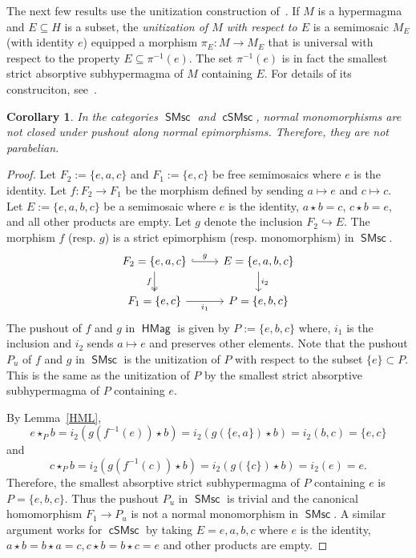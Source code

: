 \documentclass[reqno]{amsart}
\newcommand{\cat}[1]{\ensuremath{\mathsf{#1}}}
\DeclareMathOperator{\HMag}{\cat{HMag}}
\DeclareMathOperator{\cSMsc}{\cat{cSMsc}}
\DeclareMathOperator{\SMsc}{\cat{SMsc}}
\numberwithin{equation}{section}
\theoremstyle{plain}
\newtheorem{corollary}[equation]{Corollary}
\theoremstyle{definition}
\begin{document}
The next few results use the unitization construction of~\cite[Definition~3.7]{NakamuraReyes}. If $M$ is a hypermagma and $E \subseteq H$ is a subset, the \emph{unitization of $M$ with respect to $E$} is a semimosaic $M_E$ (with identity $e$) equipped a morphism $\pi_E \colon M \to M_E$ that is universal with respect to the property $E \subseteq \pi^{-1}(e)$. The set $\pi^{-1}(e)$ is in fact the smallest strict absorptive subhypermagma of $M$ containing $E$. For details of its construciton, see~\cite[Lemma~3.10]{NakamuraReyes}.

\begin{corollary}
    In the categories $\SMsc$ and $\cSMsc$, normal monomorphisms are not closed under pushout along normal epimorphisms. Therefore, they are not parabelian.
\end{corollary}
\begin{proof}
    Let $F_2:=\{e, a, c\}$ and $F_1:=\{e, c\}$ be free semimosaics where $e$ is the identity. Let $f \colon F_2\rightarrow F_1$ be the morphism defined by sending $a\mapsto e$ and $c\mapsto c$. Let $E:=\{e, a, b, c\}$ be a semimosaic where $e$ is the identity,  $a\star b=c$, $c\star b=e$, and all other products are empty. Let $g$ denote the inclusion $F_2\hookrightarrow E$. The morphism $f$ (resp. $g$) is a strict epimorphism (resp. monomorphism) in $\SMsc$.
\[\begin{tikzcd}
	F_2={\{e, a, c\}} & E={\{e, a, b, c\}} \\
	F_1={\{e, c\}} & P={\{e, b, c\}}
	\arrow["g", hook, from=1-1, to=1-2]
	\arrow["f"', two heads, from=1-1, to=2-1]
	\arrow["{i_2}", from=1-2, to=2-2]
	\arrow["{i_1}"', from=2-1, to=2-2]
\end{tikzcd}\]
The pushout of $f$ and $g$ in $\HMag$ is given by $P:=\{e, b, c\}$ where, $i_1$ is the inclusion and $i_2$ sends $a\mapsto e$ and preserves other elements. Note that the pushout $P_u$ of $f$ and $g$ in $\SMsc$ is the unitization of $P$ with respect to the subset $\{e\}\subset P$. This is the same as the unitization of $P$ by the smallest strict absorptive subhypermagma of $P$ containing $e$.

By Lemma~\ref{HML}, 
$$e\star_P b=i_2(g(f^{-1}(e))\star b)=i_2(g(\{e, a\})\star b)=i_2(b, c)=\{e, c\}$$
and
$$c\star_Pb=i_2(g(f^{-1}(c))\star b)=i_2(g(\{c\})\star b)=i_2(e)=e.$$
Therefore, the smallest absorptive strict subhypermagma of $P$ containing $e$ is $P=\{e, b, c\}$. Thus the pushout $P_u$ in $\SMsc$ is trivial and the canonical homomorphism $F_1\rightarrow P_u$ is not a normal monomorphism in $\SMsc$. A similar argument works for $\cSMsc$ by taking $E={e, a, b, c}$ where $e$ is the identity, $a\star b=b\star a=c, c\star b=b\star c=e$ and other products are empty.
\end{proof}
\end{document}
